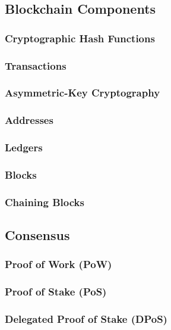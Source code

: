 \subsection{Blockchain Components}

\subsubsection{Cryptographic Hash Functions}

\subsubsection{Transactions}

\subsubsection{Asymmetric-Key Cryptography}

\subsubsection{Addresses}

\subsubsection{Ledgers}

\subsubsection{Blocks}

\subsubsection{Chaining Blocks}

\subsection{Consensus}

\subsubsection{Proof of Work (PoW)}

\subsubsection{Proof of Stake (PoS)}

\subsubsection{Delegated Proof of Stake (DPoS)}

